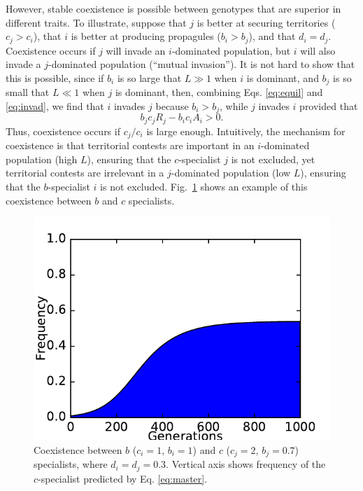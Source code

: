 \documentclass[11pt]{article}
\begin{document}
However, stable coexistence is possible between genotypes that are superior in different traits. To illustrate, suppose that $j$ is better at securing territories ($c_j>c_i$), that $i$ is better at producing propagules ($b_i>b_j$), and that $d_i=d_j$. Coexistence occurs if $j$ will invade an $i$-dominated population, but $i$ will also invade a $j$-dominated population (``mutual invasion''). It is not hard to show that this is possible, since if $b_i$ is so large that $L\gg 1$ when $i$ is dominant, and $b_j$ is so small that $L\ll 1$ when $j$ is dominant, then, combining Eqs. \eqref{eq:equil} and \eqref{eq:invad}, we find that $i$ invades $j$ because $b_i>b_j$, while $j$ invades $i$ provided that
\begin{equation}
b_jc_jR_j-b_i c_i A_i>0. \label{eq:jinvadcoex}
\end{equation}
Thus, coexistence occurs if $c_j/c_i$ is large enough. Intuitively, the mechanism for coexistence is that territorial contests are important in an $i$-dominated population (high $L$), ensuring that the $c$-specialist $j$ is not excluded, yet territorial contests are irrelevant in a $j$-dominated population (low $L$), ensuring that the $b$-specialist $i$ is not excluded. Fig.~\ref{fig:coex} shows an example of this coexistence between $b$ and $c$ specialists. 

\begin{figure}
\centering
\includegraphics[scale=0.7]{coex.pdf}
\caption{\label{fig:coex} Coexistence between $b$ ($c_i=1$, $b_i=1$) and $c$ ($c_j=2$, $b_j=0.7$) specialists, where $d_i=d_j=0.3$. Vertical axis shows frequency of the $c$-specialist predicted by Eq. \eqref{eq:master}.} 
\end{figure}
\end{document}
